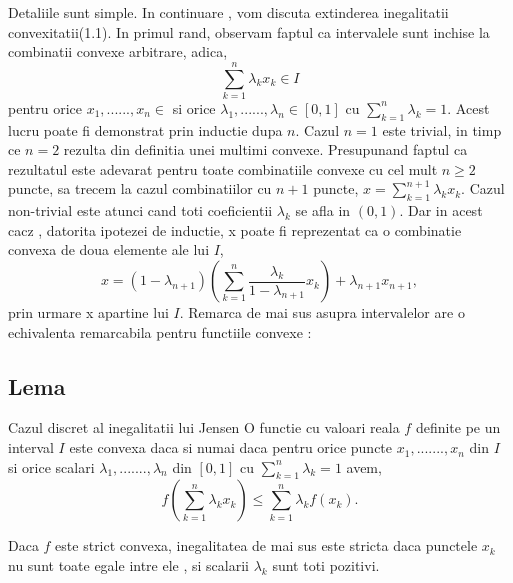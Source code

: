 \documentclass[a4paper,12pt,oneside]{report}
\begin{document}
Detaliile sunt simple. 
In continuare , vom discuta extinderea inegalitatii convexitatii(1.1). In primul rand, observam faptul ca intervalele sunt inchise la combinatii convexe arbitrare, adica, 
\begin{displaymath}
  \sum_{ k= 1}^{n}\lambda _{k}x_{k} \in I
\end{displaymath}
pentru orice \(x_{1},......, x_{n} \in\)  si orice \(\lambda _{1},......, \lambda _{n} \in \left [ 0 , 1  \right ]\) cu \(\sum_{k = 1}^{n} \lambda _{k} = 1\). Acest lucru poate fi demonstrat prin inductie dupa \(n\). Cazul \(n=1\) este trivial, in timp ce \(n = 2\) rezulta din definitia unei multimi convexe. Presupunand faptul ca rezultatul este adevarat pentru toate combinatiile convexe cu cel mult \(n\geq 2\) puncte, sa trecem la cazul combinatiilor cu \(n + 1\) puncte, \(x = \sum_{k = 1}^{n + 1} \lambda _{k}x_{k}\). Cazul non-trivial este atunci cand toti coeficientii \(\lambda _{k}\) se afla in \(\left ( 0 , 1 \right )\). Dar in acest cacz , datorita ipotezei de inductie, x poate fi reprezentat ca o combinatie convexa de doua elemente ale lui \(I\), 
\begin{displaymath}
  x = \left ( 1 - \lambda _{n + 1} \right )\left ( \sum_{k = 1}^{n} \frac{\lambda _{k}}{1 - \lambda _{n + 1}} x_{k}\right ) + \lambda _{n + 1}x_{n + 1},
\end{displaymath}
prin urmare x apartine lui \(I\). 
	Remarca de mai sus asupra intervalelor are o echivalenta remarcabila pentru functiile convexe :

\subsection{Lema}
Cazul discret al inegalitatii lui Jensen
O functie cu valoari reala \(f\) definite pe un interval \(I\) este convexa daca si numai daca pentru orice puncte \(x_{1},.......,x_{n}\) din \(I\) si orice scalari \(\lambda _{1},.......,\lambda _{n}\) din \(\left [ 0 , 1 \right ]\) cu \(\sum_{k = 1}^{n}\lambda _{k}= 1\) avem, 
\begin{displaymath}
  f\left ( \sum_{k = 1}^{n} \lambda _{k}x_{k}\right )\leq \sum_{k = 1}^{n}\lambda _{k}f\left ( x_{k} \right ).
\end{displaymath}

Daca \(f\) este strict convexa, inegalitatea de mai sus este stricta daca punctele \(x_{k}\) nu sunt toate egale intre ele , si scalarii \(\lambda _{k}\) sunt toti pozitivi. 
\end{document}
